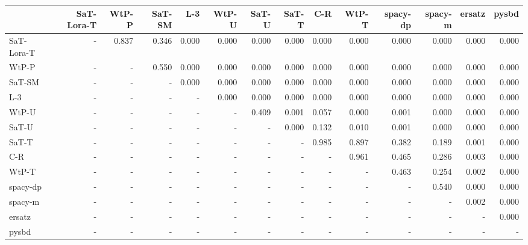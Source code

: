\begin{tabular}{lrrrrrrrrrrrrr}
\toprule
 & SaT-Lora-T & WtP-P & SaT-SM & L-3 & WtP-U & SaT-U & SaT-T & C-R & WtP-T & spacy-dp & spacy-m & ersatz & pysbd \\
\midrule
SaT-Lora-T & - & 0.837 & 0.346 & 0.000 & 0.000 & 0.000 & 0.000 & 0.000 & 0.000 & 0.000 & 0.000 & 0.000 & 0.000 \\
WtP-P & - & - & 0.550 & 0.000 & 0.000 & 0.000 & 0.000 & 0.000 & 0.000 & 0.000 & 0.000 & 0.000 & 0.000 \\
SaT-SM & - & - & - & 0.000 & 0.000 & 0.000 & 0.000 & 0.000 & 0.000 & 0.000 & 0.000 & 0.000 & 0.000 \\
L-3 & - & - & - & - & 0.000 & 0.000 & 0.000 & 0.000 & 0.000 & 0.000 & 0.000 & 0.000 & 0.000 \\
WtP-U & - & - & - & - & - & 0.409 & 0.001 & 0.057 & 0.000 & 0.001 & 0.000 & 0.000 & 0.000 \\
SaT-U & - & - & - & - & - & - & 0.000 & 0.132 & 0.010 & 0.001 & 0.000 & 0.000 & 0.000 \\
SaT-T & - & - & - & - & - & - & - & 0.985 & 0.897 & 0.382 & 0.189 & 0.001 & 0.000 \\
C-R & - & - & - & - & - & - & - & - & 0.961 & 0.465 & 0.286 & 0.003 & 0.000 \\
WtP-T & - & - & - & - & - & - & - & - & - & 0.463 & 0.254 & 0.002 & 0.000 \\
spacy-dp & - & - & - & - & - & - & - & - & - & - & 0.540 & 0.000 & 0.000 \\
spacy-m & - & - & - & - & - & - & - & - & - & - & - & 0.002 & 0.000 \\
ersatz & - & - & - & - & - & - & - & - & - & - & - & - & 0.000 \\
pysbd & - & - & - & - & - & - & - & - & - & - & - & - & - \\
\bottomrule
\end{tabular}

